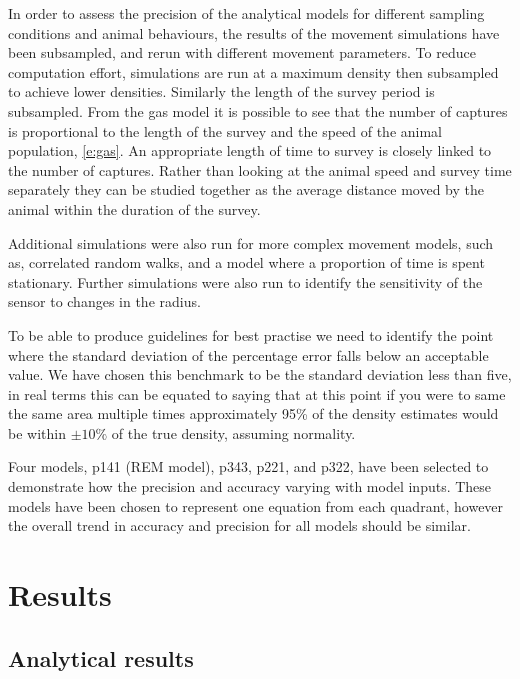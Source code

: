 \documentclass[a4paper,10pt,reqno,oneside]{amsart}
\begin{document}
In order to assess the precision of the analytical models for different sampling conditions and animal behaviours, the results of the movement simulations have been subsampled, and rerun with different movement parameters. To reduce computation effort, simulations are run at a maximum density then subsampled to achieve lower densities. Similarly the length of the survey period is subsampled. From the gas model it is possible to see that the number of captures is proportional to the length of the survey and the speed of the animal population, \ref{e:gas}. An appropriate length of time to survey is closely linked to the number of captures. Rather than looking at the animal speed and survey time separately they can be studied together as the average distance moved by the animal within the duration of the survey. 

Additional simulations were also run for more complex movement models, such as, correlated random walks, and a model where a proportion of time is spent stationary. Further simulations were also run to identify the sensitivity of the sensor to changes in the radius.

To be able to produce guidelines for best practise we need to identify the point where the standard deviation of the percentage error falls below an acceptable value. We have chosen this benchmark to be the standard deviation less than five, in real terms this can be equated to saying that at this point if you were to same the same area multiple times approximately 95\% of the density estimates would be within $\pm10\%$ of the true density, assuming normality. 

Four models, p141 (REM model), p343, p221, and p322, have been selected to demonstrate how the precision and accuracy varying with model inputs. These models have been chosen to represent one equation from each quadrant, however the overall trend in accuracy and precision for all models should be similar.


\section{Results}

\subsection{Analytical results}
\end{document}
